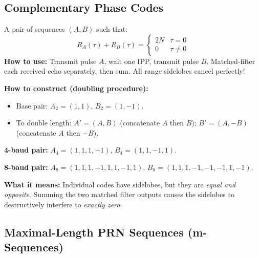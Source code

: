 \documentclass[10pt,letterpaper]{article}
\begin{document}
\subsection{Complementary Phase Codes}

\begin{tcolorbox}[formulabox, title={Complementary Phase Codes}]
A pair of sequences $(A, B)$ such that:
\begin{equation}
  R_A(\tau) + R_B(\tau) = \begin{cases} 2N & \tau = 0 \\ 0 & \tau \neq 0 \end{cases}
\end{equation}
\textbf{How to use:} Transmit pulse $A$, wait one IPP, transmit pulse $B$. Matched-filter each received echo separately, then sum. All range sidelobes cancel perfectly!

\textbf{How to construct (doubling procedure):}
\begin{itemize}[noitemsep]
  \item Base pair: $A_2 = (1,1)$, $B_2 = (1,-1)$.
  \item To double length: $A' = (A,B)$ (concatenate $A$ then $B$); $B' = (A,-B)$ (concatenate $A$ then $-B$).
\end{itemize}

\textbf{4-baud pair:} $A_4 = (1,1,1,-1)$, $B_4 = (1,1,-1,1)$.

\textbf{8-baud pair:} $A_8 = (1,1,1,-1,1,1,-1,1)$, $B_8 = (1,1,1,-1,-1,-1,1,-1)$.

\textbf{What it means:} Individual codes have sidelobes, but they are \emph{equal and opposite}. Summing the two matched filter outputs causes the sidelobes to destructively interfere to \emph{exactly zero}.
\end{tcolorbox}

\subsection{Maximal-Length PRN Sequences (m-Sequences)}
\end{document}
